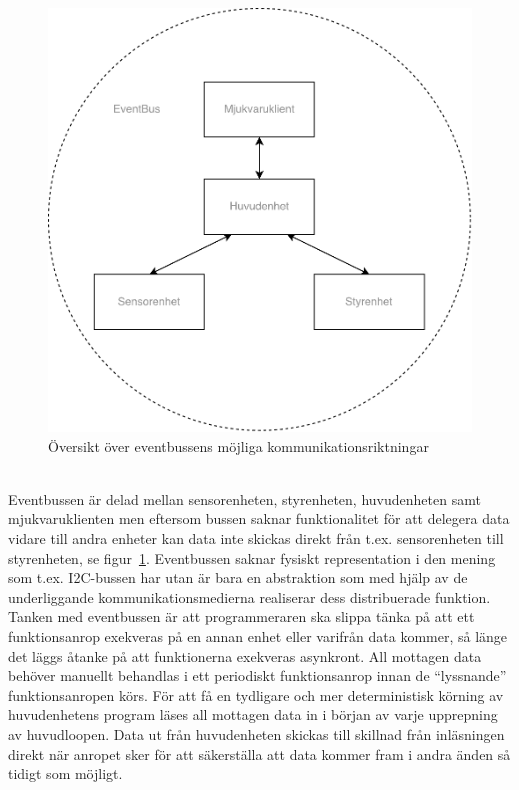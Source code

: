 \documentclass{article}
\begin{document}
\begin{figure}[H]
\centering
\includegraphics[scale=0.45]{EventBus}
\caption{Översikt över eventbussens möjliga kommunikationsriktningar}
\label{fig:eventbus_structure}
\end{figure}
\ \\
Eventbussen är delad mellan sensorenheten, styrenheten, huvudenheten samt mjukvaruklienten men eftersom bussen saknar funktionalitet för att delegera data vidare till andra enheter kan data inte skickas direkt från t.ex. sensorenheten till styrenheten, se figur~\ref{fig:eventbus_structure}. Eventbussen saknar fysiskt representation i den mening som t.ex. I2C-bussen har utan är bara en abstraktion som med hjälp av de underliggande kommunikationsmedierna realiserar dess distribuerade funktion.
\newline\newline
Tanken med eventbussen är att programmeraren ska slippa tänka på att ett funktionsanrop exekveras på en annan enhet eller varifrån data kommer, så länge det läggs åtanke på att funktionerna exekveras asynkront. All mottagen data behöver manuellt behandlas i ett periodiskt funktionsanrop innan de ``lyssnande'' funktionsanropen körs. För att få en tydligare och mer deterministisk körning av huvudenhetens program läses all mottagen data in i början av varje upprepning av huvudloopen. Data ut från huvudenheten skickas till skillnad från inläsningen direkt när anropet sker för att säkerställa att data kommer fram i andra änden så tidigt som möjligt.
\end{document}
